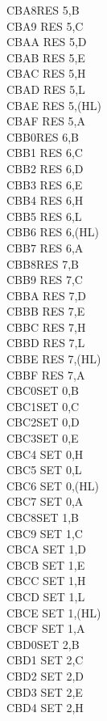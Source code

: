 \documentclass[oneside,a4paper]{book}
\begin{document}
\begin{multicols}{3}
{\begin{tabbing}
CBA8\>RES 5,B\\
CBA9\> 	RES 5,C\\
CBAA\> 	RES 5,D\\
CBAB\> 	RES 5,E\\
CBAC\> 	RES 5,H\\
CBAD\> 	RES 5,L\\
CBAE\> 	RES 5,(HL)\\
CBAF\> 	RES 5,A\\
CBB0\>RES 6,B\\
CBB1\> 	RES 6,C\\
CBB2\> 	RES 6,D\\
CBB3\> 	RES 6,E\\
CBB4\> 	RES 6,H\\
CBB5\> 	RES 6,L\\
CBB6\> 	RES 6,(HL)\\
CBB7\> 	RES 6,A\\
CBB8\>RES 7,B\\
CBB9\> 	RES 7,C\\
CBBA\> 	RES 7,D\\
CBBB\> 	RES 7,E\\
CBBC\> 	RES 7,H\\
CBBD\> 	RES 7,L\\
CBBE\> 	RES 7,(HL)\\
CBBF\> 	RES 7,A\\
CBC0\>SET 0,B\\
CBC1\>SET 0,C\\
CBC2\>SET 0,D\\
CBC3\>SET 0,E\\
CBC4\> 	SET 0,H\\
CBC5\> 	SET 0,L\\
CBC6\> 	SET 0,(HL)\\
CBC7\> 	SET 0,A\\
CBC8\>SET 1,B\\
CBC9\> 	SET 1,C\\
CBCA\> 	SET 1,D\\
CBCB\> 	SET 1,E\\
CBCC\> 	SET 1,H\\
CBCD\> 	SET 1,L\\
CBCE\> 	SET 1,(HL)\\
CBCF\> 	SET 1,A\\
CBD0\>SET 2,B\\
CBD1\> 	SET 2,C\\
CBD2\> 	SET 2,D\\
CBD3\> 	SET 2,E\\
CBD4\> 	SET 2,H\\

\end{tabbing}}
\end{multicols}
\end{document}
